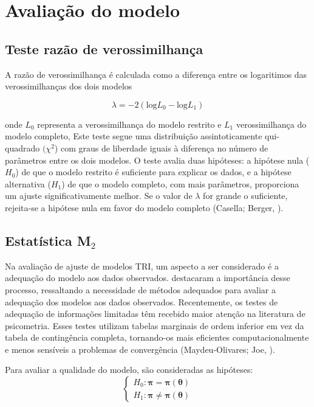 \section{Avaliação do modelo}

\subsection{Teste razão de verossimilhança}

 A razão de verossimilhança é calculada como a diferença entre os logaritimos das verossimilhanças dos dois modelos

\[
\lambda = -2 (\text{log} L_0 - \text{log} L_1)
\]

\noindent onde $L_0$ representa a verossimilhança do modelo restrito e
$L_1$ verossimilhança do modelo completo, Este teste segue uma distribuição assintoticamente qui-quadrado $(\chi^2$) com graus de liberdade iguais à diferença no número de parâmetros entre os dois modelos. O teste avalia duas hipóteses: a hipótese nula ($H_0$) de que o modelo restrito é suficiente para explicar os dados, e a hipótese alternativa ($H_1$) de que o modelo completo, com mais parâmetros, proporciona um ajuste significativamente melhor. Se o valor de $\lambda$ for grande o suficiente, rejeita-se a hipótese nula em favor do modelo completo (Casella; Berger, \citeyear{casella2010inferencia}). 

\subsection{Estatística M$_2$}

Na avaliação de ajuste de modelos TRI, um aspecto a ser considerado é a adequação do modelo aos dados observados.  destacaram a importância desse processo, ressaltando a necessidade de métodos adequados para avaliar a adequação dos modelos aos dados observados. Recentemente, os testes de adequação de informações limitadas têm recebido maior atenção na literatura de psicometria. Esses testes utilizam tabelas marginais de ordem inferior em vez da tabela de contingência completa, tornando-os mais eficientes computacionalmente e menos sensíveis a problemas de convergência (Maydeu-Olivares; Joe, \citeyear{maydeu2014assessing}).

Para avaliar a qualidade do modelo, são consideradas as hipóteses:
\[
\begin{cases}
	H_0: \boldsymbol{\pi} = \boldsymbol{\pi}(\boldsymbol{\theta}) \\
	
	H_1: \boldsymbol{\pi} \neq \boldsymbol{\pi}(\boldsymbol{\theta})
\end{cases}
\]

